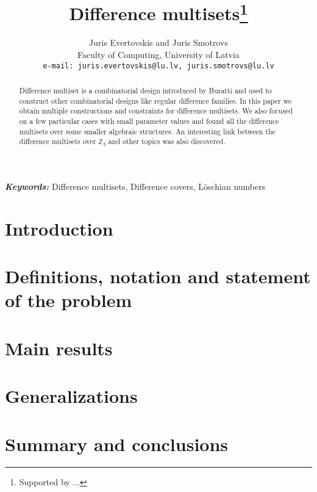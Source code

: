 \documentclass{article}
\theoremstyle{plain}
\theoremstyle{definition}
\theoremstyle{remark}
\providecommand{\keywords}[1]{\textbf{\textit{Keywords: }} #1}
\begin{document}
\title{Difference multisets\thanks{Supported by ...}}
\date{}
\author{Juris Evertovskis and Juris Smotrovs\\
\small Faculty of Computing, University of Latvia\\
{\small \tt e-mail: juris.evertovskis@lu.lv, juris.smotrovs@lu.lv}}

\maketitle
	
	\begin{abstract}
		Difference multiset is a combinatorial design introduced by Buratti \cite{buratti1999old} and used to construct other combinatorial designs like regular difference families. In this paper we obtain multiple constructions and constraints for difference multisets. We also focused on a few particular cases with small parameter values and found all the difference multisets over some smaller algebraic structures. An interesting link between the difference multisets over $\mathbb Z_3$ and other topics was also discovered.
	\end{abstract}
	
	\keywords{Difference multisets, Difference covers, Löschian numbers}
    
    \section{Introduction}
    
     
	\section{Definitions, notation and statement of the problem}
    
	
    \section{Main results}
    
	
    \section{Generalizations}
    
	
    \section{Summary and conclusions}
    
    
	
	
\end{document}
